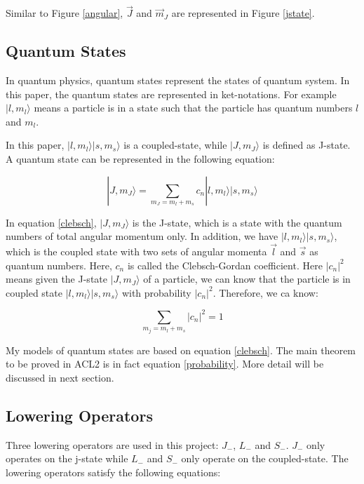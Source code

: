 \documentclass[12pt,journal,compsoc]{IEEEtran}
\begin{document}
Similar to Figure \ref{angular}, $\vec{J}$ and $\vec{m}_J$ are represented in Figure \ref{jstate}.

\subsection{Quantum States}

In quantum physics, quantum states represent the states of quantum system. In this paper, the quantum states are represented in ket-notations. For example $|l,m_l \rangle$  means a particle is in a state such that the particle has quantum numbers $l$ and $m_l$. 

In this paper, $|l,m_l\rangle|s,m_s\rangle$ is a coupled-state, while $|J,m_J\rangle$ is defined as J-state. A quantum state can be represented in the following equation:

\begin{equation}
|J, m_J \rangle = \sum\limits_{m_J = m_l+m_s} c_n |l,m_l\rangle |s,m_s \rangle
\label{clebsch}
\end{equation}


In equation \ref{clebsch}, $|J,m_J \rangle$ is the J-state, which is a state with the quantum numbers of total angular momentum only. In addition, we have $|l,m_l\rangle|s,m_s\rangle$, which is the coupled state with two sets of angular momenta $\vec{l}$ and $\vec{s}$ as quantum numbers. Here, $c_n$ is called the Clebsch-Gordan coefficient. Here $|c_n|^2$ means given the J-state $|J,m_J \rangle$ of a particle, we can know that the particle is in coupled state $|l,m_l\rangle|s,m_s\rangle$ with probability $|c_n|^2$. Therefore, we ca know:

\begin{equation}
\sum\limits_{m_j= m_l+m_s} |c_n|^2 =1
\label{probability}
\end{equation}

My models of quantum states are based on equation \ref{clebsch}. The main theorem to be proved in ACL2 is in fact equation \ref{probability}. More detail will be discussed in next section.

\subsection{Lowering Operators}

Three lowering operators are used in this project: $J_{-}$, $L_{-}$ and $S_{-}$. $J_-$ only operates on the j-state while $L_-$ and $S_-$ only operate on the coupled-state. The lowering operators satisfy the following equations:
\end{document}
